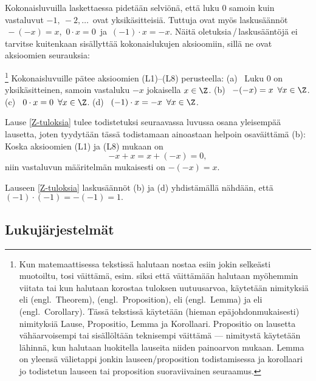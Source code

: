 Kokonaisluvuilla laskettaessa pidetään selviönä, että luku $0$ samoin kuin vastaluvut
$-1,\ -2, \ldots\,$ ovat yksikäsitteisiä. Tuttuja ovat myös laskusäännöt
$\,-(-x)=x$, $\,0 \cdot x=0\,$ ja $\,(-1) \cdot x = -x$. Näitä oletuksia\,/\,laskusääntöjä ei
tarvitse kuitenkaan sisällyttää kokonaislukujen aksioomiin, sillä ne ovat aksioomien seurauksia:
\begin{Lause}\footnote[2]{Kun matemaattisessa tekstissä halutaan nostaa esiin jokin selkeästi 
muotoiltu, tosi väittämä, esim. siksi että väittämään halutaan myöhemmin viitata tai kun 
halutaan korostaa tuloksen uutuusarvoa, käytetään nimityksiä  eli  
(engl.\ Theorem),  (engl.\ Proposition),  eli  
(engl.\ Lemma) ja  eli  (engl.\ Corollary). Tässä tekstissä 
käytetään (hieman epäjohdonmukaisesti) nimityksiä Lause, Propositio, Lemma ja Korollaari. 
Propositio on lausetta vähäarvoisempi tai sisällöltään teknisempi väittämä --- nimitystä 
käytetään lähinnä, kun halutaan luokitella lauseita niiden painoarvon mukaan. Lemma on yleensä
välietappi jonkin lauseen/proposition todistamisessa ja korollaari jo todistetun lauseen tai 
proposition suoraviivainen seuraamus. 
 
} \label{Z-tuloksia}
Kokonaisluvuille pätee aksioomien (L1)--(L8) perusteella: \vspace{1mm}\newline
(a) \ Luku $0$ on yksikäsitteinen, samoin vastaluku $-x$ jokaisella $x\in\Z$. \newline
(b) \ $-(-x)=x\,\ \forall x\in\Z$. \newline
(c) \ $0 \cdot x = 0\,\ \forall x\in\Z$. \newline
(d) \ $(-1) \cdot x = -x\,\ \forall x\in\Z$. 
\end{Lause}
Lause \ref{Z-tuloksia} tulee todistetuksi seuraavassa luvussa osana yleisempää lausetta,
joten tyydytään tässä todistamaan ainoastaan helpoin osaväittämä (b): Koska aksioomien
(L1) ja (L8) mukaan on
\[
-x+x = x+(-x) = 0,
\]
niin vastaluvun määritelmän mukaisesti on $-(-x)=x$. \loppu
\begin{Exa} Lauseen \ref{Z-tuloksia} laskusäännöt (b) ja (d) yhdistämällä nähdään, että
$(-1)\cdot(-1)=-(-1)=1.$ \loppu \end{Exa}

\subsection{Lukujärjestelmät}
%

